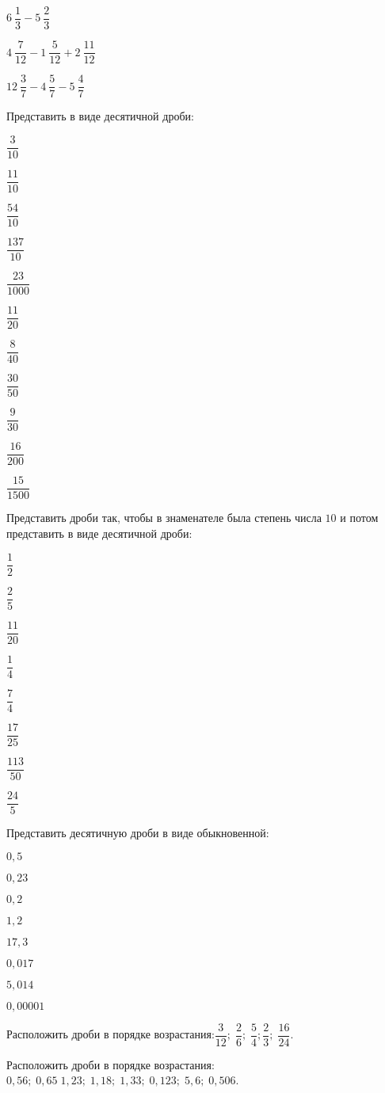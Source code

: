 \begin{listofex}
\begin{enumcols}[itemcolumns=3]
		\item \( 6\:\dfrac{1}{3}-5\:\dfrac{2}{3} \)
		\item \( 4\:\dfrac{7}{12}-1\:\dfrac{5}{12}+2\:\dfrac{11}{12} \)
		\item \( 12\:\dfrac{3}{7}-4\:\dfrac{5}{7}-5\:\dfrac{4}{7} \)
	\end{enumcols}
	\item Представить в виде десятичной дроби:
	\begin{enumcols}[itemcolumns=4]
		\item \( \dfrac{3}{10} \)
		\item \( \dfrac{11}{10} \)
		\item \( \dfrac{54}{10} \)
		\item \( \dfrac{137}{10} \)
		\item \( \dfrac{23}{1000} \)
		\item \( \dfrac{11}{20} \)
		\item \( \dfrac{8}{40} \)
		\item \( \dfrac{30}{50} \)
		\item \( \dfrac{9}{30} \)
		\item \( \dfrac{16}{200} \)
		\item \( \dfrac{15}{1500} \)
	\end{enumcols}
	\item Представить дроби так, чтобы в знаменателе была степень числа \( 10 \) и потом представить в виде десятичной дроби:
	\begin{enumcols}[itemcolumns=8]
		\item \( \dfrac{1}{2} \)
		\item \( \dfrac{2}{5} \)
		\item \( \dfrac{11}{20} \)
		\item \( \dfrac{1}{4} \)
		\item \( \dfrac{7}{4} \)
		\item \( \dfrac{17}{25} \)
		\item \( \dfrac{113}{50} \)
		\item \( \dfrac{24}{5} \)
	\end{enumcols}
	\item Представить десятичную дроби в виде обыкновенной:
	\begin{enumcols}[itemcolumns=4]
		\item \( 0,5 \)
		\item \( 0,23 \)
		\item \( 0,2 \)
		\item \( 1,2 \)
		\item \( 17,3 \)
		\item \( 0,017 \)
		\item \( 5,014 \)
		\item \( 0,00001 \)
	\end{enumcols}
	\item Расположить дроби в порядке возрастания:\( \dfrac{3}{12};\;\dfrac{2}{6};\;\dfrac{5}{4};\dfrac{2}{3};\;\dfrac{16}{24} \).
	\item Расположить дроби в порядке возрастания:\( 0,56;\;0,65\;1,23;\;1,18;\;1,33;\;0,123;\;5,6;\;0,506 \).
\end{listofex}
